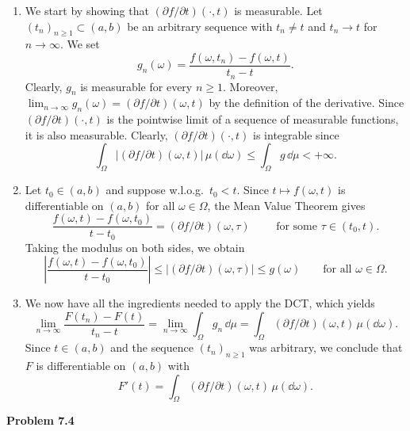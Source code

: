 \begin{enumerate}[label={(\arabic*)}]
	\item We start by showing that $(\partial f/\partial t)(\cdot,t)$ is measurable. Let $(t_n)_{n\ge 1}\subset(a,b)$ be an arbitrary sequence with $t_n\ne t$ and $t_n\to t$ for $n\to\infty$. We set
	\[
		g_n(\omega) = \frac{f(\omega,t_n)-f(\omega,t)}{t_n-t}.
	\]
	Clearly, $g_n$ is measurable for every $n\ge 1$. Moreover, $\lim_{n\to\infty} g_n(\omega) = (\partial f/\partial t)(\omega,t)$ by the definition of the derivative. Since $(\partial f/\partial t)(\cdot,t)$ is the pointwise limit of a sequence of measurable functions, it is also measurable. Clearly, $(\partial f/\partial t)(\cdot,t)$ is integrable since
	\[
		\int_\Omega |(\partial f/\partial t)(\omega,t)|\,\mu(\dd\omega) \le \int_\Omega g\,\dd\mu <+\infty.
	\]
	
	\item Let $t_0\in (a,b)$ and suppose w.l.o.g.\ $t_0<t$. Since $t\mapsto f(\omega,t)$ is differentiable on $(a,b)$ for all $\omega\in\Omega$, the Mean Value Theorem gives
	\[
		\frac{f(\omega,t)-f(\omega,t_0)}{t-t_0} = (\partial f/\partial t)(\omega,\tau)\qquad\text{	for some $\tau\in(t_0,t)$.}
	\]
	Taking the modulus on both sides, we obtain
	\[
		\left|\frac{f(\omega,t)-f(\omega,t_0)}{t-t_0}\right| \le |(\partial f/\partial t)(\omega,\tau)|\le g(\omega)\qquad\text{for all $\omega\in\Omega$}.
	\]
	\item We now have all the ingredients needed to apply the DCT, which yields
	\[
		\lim_{n\to\infty} \frac{F(t_n)-F(t)}{t_n-t} = \lim_{n\to\infty} \int_\Omega g_n\,\dd\mu = \int_\Omega (\partial f/\partial t)(\omega,t)\,\mu(\dd\omega).
	\]
	Since $t\in(a,b)$ and the sequence $(t_n)_{n\ge 1}$ was arbitrary, we conclude that $F$ is differentiable on $(a,b)$ with 
	\[
		F'(t) = \int_\Omega (\partial f/\partial t)(\omega,t)\,\mu(\dd\omega).
	\]
\end{enumerate}

\bigskip

\textbf{Problem 7.4}


